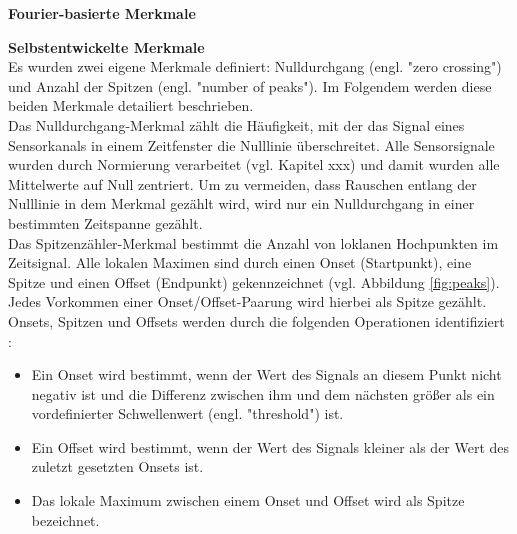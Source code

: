 \textbf{Fourier-basierte Merkmale \\}


\textbf{Selbstentwickelte Merkmale \\}
Es wurden zwei eigene Merkmale definiert: Nulldurchgang (engl. "zero crossing") und Anzahl der Spitzen (engl. "number of peaks"). Im Folgendem werden diese beiden Merkmale detailiert beschrieben. \\

Das Nulldurchgang-Merkmal zählt die Häufigkeit, mit der das Signal eines Sensorkanals in einem Zeitfenster die Nulllinie überschreitet.
Alle Sensorsignale wurden durch Normierung verarbeitet (vgl. Kapitel xxx) und damit wurden alle Mittelwerte auf Null zentriert.
Um zu vermeiden, dass Rauschen entlang der Nulllinie in dem Merkmal gezählt wird, wird nur ein Nulldurchgang in einer bestimmten Zeitspanne gezählt. \\


Das Spitzenzähler-Merkmal bestimmt die Anzahl von loklanen Hochpunkten im Zeitsignal.
Alle lokalen Maximen sind durch einen Onset (Startpunkt), eine Spitze und einen Offset (Endpunkt) gekennzeichnet (vgl. Abbildung \ref{fig:peaks}). 
Jedes Vorkommen einer Onset/Offset-Paarung wird hierbei als Spitze gezählt.
Onsets, Spitzen und Offsets werden durch die folgenden Operationen identifiziert \cite{BSc_Gouverneu}:

\begin{itemize} %
  \item Ein Onset wird bestimmt, wenn der Wert des Signals an diesem Punkt nicht negativ ist und die Differenz zwischen ihm und dem nächsten größer als ein vordefinierter Schwellenwert (engl. "threshold") ist.

  \item Ein Offset wird bestimmt, wenn der Wert des Signals kleiner als der Wert des zuletzt gesetzten Onsets ist.

  \item Das lokale Maximum zwischen einem Onset und Offset wird als Spitze bezeichnet.
\end{itemize} \vspace{0.2cm}


